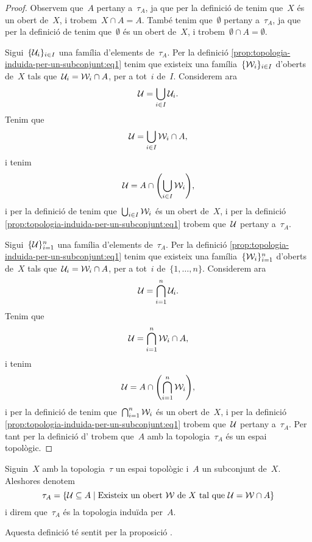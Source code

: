\documentclass[../topologia.tex]{subfiles}
\begin{document}
    \begin{proof}
        Observem que~\(A\) pertany a~\(\tau_{A}\), ja que per la definició de  tenim que~\(X\) és un obert de~\(X\), i trobem~\(X\cap A=A\).
        També tenim que~\(\emptyset\) pertany a~\(\tau_{A}\), ja que per la definició de  tenim que~\(\emptyset\) és un obert de~\(X\), i trobem~\(\emptyset\cap A=\emptyset\).

        Sigui~\(\{\mathcal{U}_{i}\}_{i\in I}\) una família d'elements de~\(\tau_{A}\).
        Per la definició \eqref{prop:topologia-induida-per-un-subconjunt:eq1} tenim que existeix una família~\(\{\mathcal{W}_{i}\}_{i\in I}\) d'oberts de~\(X\) tals que~\(\mathcal{U}_{i}=\mathcal{W}_{i}\cap A\), per a tot~\(i\) de~\(I\).
        Considerem ara
        \[
            \mathcal{U}=\bigcup_{i\in I}\mathcal{U}_{i}.
        \]
        Tenim que
        \[
            \mathcal{U}=\bigcup_{i\in I}\mathcal{W}_{i}\cap A,
        \]
        i tenim
        \[
            \obert{U}=A\cap\left(\bigcup_{i\in I}\obert{W}_{i}\right),
        \]
        i per la definició de  tenim que~\(\bigcup_{i\in I}\mathcal{W}_{i}\) és un obert de~\(X\), i per la definició \eqref{prop:topologia-induida-per-un-subconjunt:eq1} trobem que~\(\mathcal{U}\) pertany a~\(\tau_{A}\).

        Sigui~\(\{\mathcal{U}\}_{i=1}^{n}\) una família d'elements de~\(\tau_{A}\).
        Per la definició \eqref{prop:topologia-induida-per-un-subconjunt:eq1} tenim que existeix una família~\(\{\mathcal{W}_{i}\}_{i=1}^{n}\) d'oberts de~\(X\) tals que~\(\mathcal{U}_{i}=\mathcal{W}_{i}\cap A\), per a tot~\(i\) de~\(\{1,\dots,n\}\).
        Considerem ara
        \[
            \mathcal{U}=\bigcap_{i=1}^{n}\mathcal{U}_{i}.
        \]
        Tenim que
        \[
            \mathcal{U}=\bigcap_{i=1}^{n}\mathcal{W}_{i}\cap A,
        \]
        i tenim
        \[
            \obert{U}=A\cap\left(\bigcap_{i=1}^{n}\obert{W}_{i}\right),
        \]
        i per la definició de  tenim que~\(\bigcap_{i=1}^{n}\mathcal{W}_{i}\) és un obert de~\(X\), i per la definició \eqref{prop:topologia-induida-per-un-subconjunt:eq1} trobem que~\(\mathcal{U}\) pertany a~\(\tau_{A}\).
        Per tant per la definició d' trobem que~\(A\) amb la topologia~\(\tau_{A}\) és un espai topològic.
    \end{proof}
    \begin{definition}
        \label{def:topologia-induida-per-un-subconjunt}
        Siguin~\(X\) amb la topologia~\(\tau\) un espai topològic i~\(A\) un subconjunt de~\(X\).
        Aleshores denotem
        \[
            \tau_{A}=\{\mathcal{U}\subseteq A\mid\text{Existeix un obert }\mathcal{W}\text{ de }X\text{ tal que }\mathcal{U}=\mathcal{W}\cap A\}
        \]
        i direm que~\(\tau_{A}\) és la topologia induïda per~\(A\).

        Aquesta definició té sentit per la proposició .
    \end{definition}
\end{document}
